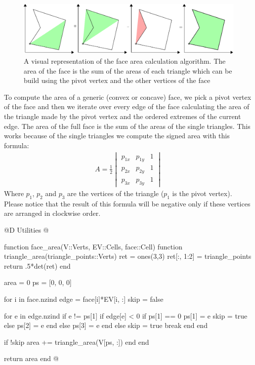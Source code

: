 \begin{figure}[h]
    \includegraphics[width=\textwidth]{./img/ch5-area.pdf}
    \caption{A visual representation of the face area calculation algorithm. The area
    of the face is the sum of the areas of each triangle which can be build using the 
    pivot vertex and the other vertices of the face}
\end{figure}
\noindent
To compute the area of a generic (convex or concave) face,
we pick a pivot vertex of the face and then we iterate over
every edge of the face calculating the area of the triangle
made by the pivot vertex and the ordered extremes of the current edge.
The area of the full face is the sum of the areas of the single triangles.
This works because of the single triangles we compute the signed area with
this formula:
\begin{gather*}
    A = \frac{1}{2}
    \begin{vmatrix}
        p_{1x} & p_{1y} & 1 \\
        p_{2x} & p_{2y} & 1 \\
        p_{3x} & p_{3y} & 1
    \end{vmatrix}
\end{gather*}
Where $p_1$, $p_2$ and $p_3$ are the vertices of the triangle ($p_1$ is the pivot vertex). 
Please notice that the result of this formula will be negative only if these vertices 
are arranged in clockwise order.

@D Utilities
@{function face_area(V::Verts, EV::Cells, face::Cell)
    function triangle_area(triangle_points::Verts)
        ret = ones(3,3)
        ret[:, 1:2] = triangle_points
        return .5*det(ret)
    end

    area = 0
    ps = [0, 0, 0]

    for i in face.nzind
        edge = face[i]*EV[i, :]
        skip = false

        for e in edge.nzind
            if e != ps[1]
                if edge[e] < 0
                    if ps[1] == 0
                        ps[1] = e
                        skip = true
                    else
                        ps[2] = e
                    end
                else
                    ps[3] = e
                end
            else
                skip = true
                break
            end
        end

        if !skip
            area += triangle_area(V[ps, :])
        end
    end

    return area
end
@}

